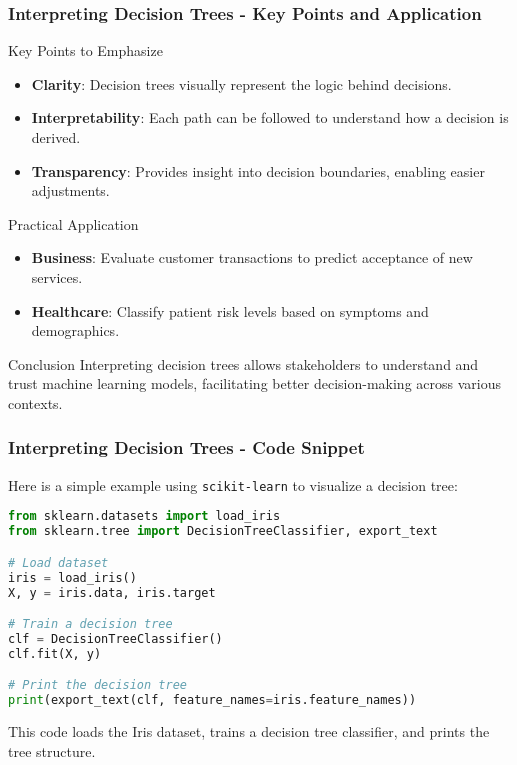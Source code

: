 \documentclass[aspectratio=169]{beamer}
\begin{document}
\begin{frame}[fragile]
    \frametitle{Interpreting Decision Trees - Key Points and Application}
    
    \begin{block}{Key Points to Emphasize}
        \begin{itemize}
            \item \textbf{Clarity}: Decision trees visually represent the logic behind decisions.
            \item \textbf{Interpretability}: Each path can be followed to understand how a decision is derived.
            \item \textbf{Transparency}: Provides insight into decision boundaries, enabling easier adjustments.
        \end{itemize}
    \end{block}

    \begin{block}{Practical Application}
        \begin{itemize}
            \item \textbf{Business}: Evaluate customer transactions to predict acceptance of new services.
            \item \textbf{Healthcare}: Classify patient risk levels based on symptoms and demographics.
        \end{itemize}
    \end{block}

    \begin{block}{Conclusion}
        Interpreting decision trees allows stakeholders to understand and trust machine learning models, facilitating better decision-making across various contexts.
    \end{block}
\end{frame}

\begin{frame}[fragile]
    \frametitle{Interpreting Decision Trees - Code Snippet}

    Here is a simple example using \texttt{scikit-learn} to visualize a decision tree:

    \begin{lstlisting}[language=Python]
from sklearn.datasets import load_iris
from sklearn.tree import DecisionTreeClassifier, export_text

# Load dataset
iris = load_iris()
X, y = iris.data, iris.target

# Train a decision tree
clf = DecisionTreeClassifier()
clf.fit(X, y)

# Print the decision tree
print(export_text(clf, feature_names=iris.feature_names))
    \end{lstlisting}

    This code loads the Iris dataset, trains a decision tree classifier, and prints the tree structure.
\end{frame}
\end{document}
